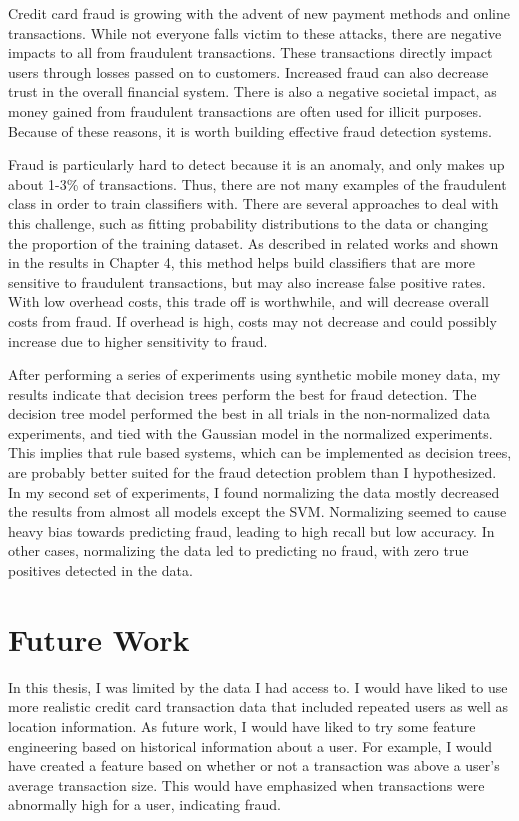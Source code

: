 \documentclass[midd]{thesis}
\begin{document}
Credit card fraud is growing with the advent of new payment methods and online transactions. While not everyone falls victim to these attacks, there are negative impacts to all from fraudulent transactions. These transactions directly impact users through losses passed on to customers. Increased fraud can also decrease trust in the overall financial system. There is also a negative societal impact, as money gained from fraudulent transactions are often used for illicit purposes. Because of these reasons, it is worth building effective fraud detection systems.

Fraud is particularly hard to detect because it is an anomaly, and only makes up about 1-3\% of transactions. Thus, there are not many examples of the fraudulent class in order to train classifiers with. There are several approaches to deal with this challenge, such as fitting probability distributions to the data or changing the proportion of the training dataset. As described in related works and shown in the results in Chapter 4, this method helps build classifiers that are more sensitive to fraudulent transactions, but may also increase false positive rates.  With low overhead costs, this trade off is worthwhile, and will decrease overall costs from fraud. If overhead is high, costs may not decrease and could possibly increase due to higher sensitivity to fraud. 

After performing a series of experiments using synthetic mobile money data, my results indicate that decision trees perform the best for fraud detection. The decision tree model performed the best in all trials in the non-normalized data experiments, and tied with the Gaussian model in the normalized experiments. This implies that rule based systems, which can be implemented as decision trees, are probably better suited for the fraud detection problem than I hypothesized. In my second set of experiments, I found normalizing the data mostly decreased the results from almost all models except the SVM. Normalizing seemed to cause heavy bias towards predicting fraud, leading to high recall but low accuracy. In other cases, normalizing the data led to predicting no fraud, with zero true positives detected in the data. 

\section{Future Work}

In this thesis, I was limited by the data I had access to. I would have liked to use more realistic credit card transaction data that included repeated users as well as location information. As future work, I would have liked to try some feature engineering based on historical information about a user. For example, I would have created a feature based on whether or not a transaction was above a user's average transaction size. This would have emphasized when transactions were abnormally high for a user, indicating fraud. 
\end{document}
